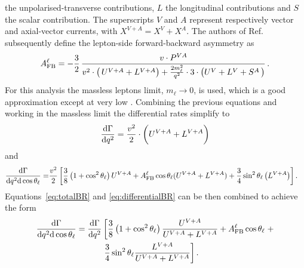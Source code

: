the unpolarised-transverse contributions, $L$ the longitudinal
contributions and $S$ the scalar contribution. The superscripts $V$ and $A$ represent respectively
vector and axial-vector currents, with $X^{V+A} = X^{V} + X^{A}$. The authors of Ref.~\cite{Gutsche:2013pp} 
subsequently define the lepton-side forward-backward asymmetry as
\begin{equation}
A_{\rm FB}^{\ell} 
= - \frac{3}{2}\,\frac{v\cdot P^{VA}}
{v^{2}\cdot\big(\,U^{V+A}
+L^{V+A}\big)+\frac{2m_{\ell}^{2}}{q^{2}}\cdot 3 \cdot
\big(U^{V}+L^{V}
+S^{A}\,\big) }\,.
\label{eq:afbDef}
\end{equation}
%
%
%
%
For this analysis the massless leptons limit, $m_\ell \rightarrow 0$, is used, which is a good
approximation except at very low \qsq. Combining the previous equations and working in the massless 
limit the differential rates simplify to
\begin{eqnarray}
\frac{\mathrm{d}\Gamma}{\mathrm{d} q^2}=
\frac{v^{2}}{2}\cdot\bigg( U^{V+A} + L^{V+A} \bigg)
\label{eq:totalBR}
\end{eqnarray}
and
\begin{align}
\frac{\mathrm{d}\Gamma}{\mathrm{d}q^2\mathrm{d}\cos\theta_\ell}=&
\frac{v^2}{2} \left[ \frac{3}{8}\left(1+\cos^2\theta_\ell\right)U^{V+A}+
A_{\rm FB}^\ell\cos\theta_\ell(U^{V+A} + L^{V+A})+
\frac{3}{4}\sin^2\theta_\ell \left(L^{V+A}\right) \right].
\label{eq:differentialBR}
\end{align}
%
%
Equations~\ref{eq:totalBR} and \ref{eq:differentialBR} can be then combined to achieve the form
\begin{align}
\frac{\mathrm{d}\Gamma}{\mathrm{d}q^2\mathrm{d}\cos\theta_\ell}=
\frac{\mathrm{d}\Gamma}{\mathrm{d}q^2}&\left[
\frac{3}{8}\left(1+\cos^2\theta_\ell\right)\frac{U^{V+A}}{U^{V+A}+L^{V+A}}+A_{\rm FB}^\ell\cos\theta_\ell\right . +
 \nonumber \\
& \left. \frac{3}{4}\sin^2\theta_\ell\frac{L^{V+A}}{U^{V+A}+L^{V+A}}\right].
\end{align}
